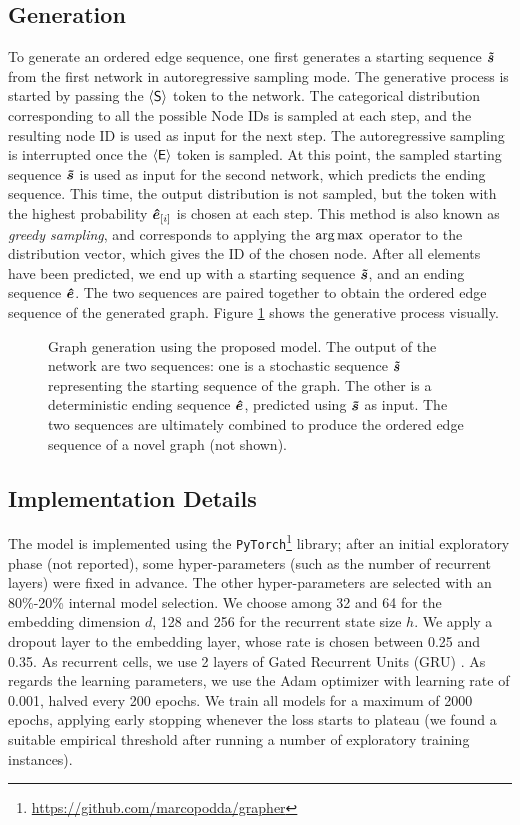 \subsection{Generation}
To generate an ordered edge sequence, one first generates a starting sequence $\Vector{\tilde{s}}$ from the first network in autoregressive sampling mode. The generative process is started by passing the $\mathsf{\langle S \rangle}$ token to the network. The categorical distribution corresponding to all the possible Node IDs is sampled at each step, and the resulting node ID is used as input for the next step. The autoregressive sampling is interrupted once the $\mathsf{\langle E \rangle}$ token is sampled. At this point, the sampled starting sequence $\Vector{\tilde{s}}$ is used as input for the second network, which predicts the ending sequence. This time, the output distribution is not sampled, but the token with the highest probability $\Elem{\hat{e}}{i}$ is chosen at each step. This method is also known as \emph{greedy sampling}, and corresponds to applying the $\argmax$ operator to the distribution vector, which gives the ID of the chosen node. After all elements have been predicted, we end up with a starting sequence $\Vector{\tilde{s}}$, and an ending sequence $\Vector{\hat{e}}$. The two sequences are paired together to obtain the ordered edge sequence of the generated graph. Figure \ref{fig:model-sampling} shows the generative process visually.
\begin{figure}[h!]
    \centering
    \resizebox{.8\textwidth}{!}{}
    \caption{Graph generation using the proposed model. The output of the network are two sequences: one is a stochastic sequence $\Vector{\tilde{s}}$ representing the starting sequence of the graph. The other is a deterministic ending sequence $\Vector{\hat{e}}$, predicted using $\Vector{\tilde{s}}$ as input. The two sequences are ultimately combined to produce the ordered edge sequence of a novel graph (not shown).}
    \label{fig:model-sampling}
\end{figure}

\subsection{Implementation Details}\label{sec:implementation}
The model is implemented using the \texttt{PyTorch}\footnote{\url{https://github.com/marcopodda/grapher}} \cite{paszke2017pytorch} library; after an initial exploratory phase (not reported), some hyper-parameters (such as the number of recurrent layers) were fixed in advance. The other hyper-parameters are selected with an 80\%-20\% internal model selection. We choose among 32 and 64 for the embedding dimension $d$, 128 and 256 for the recurrent state size $h$. We apply a dropout layer to the embedding layer, whose rate is chosen between 0.25 and 0.35. As recurrent cells, we use 2 layers of Gated Recurrent Units (GRU) \cite{cho2014gru}. As regards the learning parameters, we use the Adam \cite{kingma2015adam} optimizer with learning rate of 0.001, halved every 200 epochs. We train all models for a maximum of 2000 epochs, applying early stopping whenever the loss starts to plateau (we found a suitable empirical threshold after running a number of exploratory training instances).

